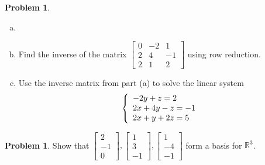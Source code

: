 \documentclass[10pt]{article}
\theoremstyle{definition}
\newtheorem{problem}[theorem]{Problem}
\newcommand{\1}[1]{\textbf{1}_{\left[#1\right]}} %
\def\R{\mathbb{R}} %
\begin{document}
\begin{problem}
  \begin{enumerate}[(a)]
    \item []
    \item Find the inverse of the matrix $
    \begin{bmatrix}
      0&-2&1\\
      2&4&-1\\
      2&1&2
    \end{bmatrix}
    $ using row reduction.
    \item Use the inverse matrix from part (a) to solve the linear system
    \begin{equation*}
      \left\{ \begin{array}{l@{}l}
          -2y+z=2 \\
          2x+4y-z=-1\\
          2x+y+2z=5
        \end{array}\right.
    \end{equation*}
  \end{enumerate}
\end{problem}
\begin{problem}
  Show that $
  \begin{bmatrix}
    2\\-1\\0
  \end{bmatrix},
  \begin{bmatrix}
    1\\3\\-1
  \end{bmatrix},
  \begin{bmatrix}
    1\\-4\\-1
  \end{bmatrix}
  $
  form a basis for $\R^{3}$.
\end{problem}
\end{document}
